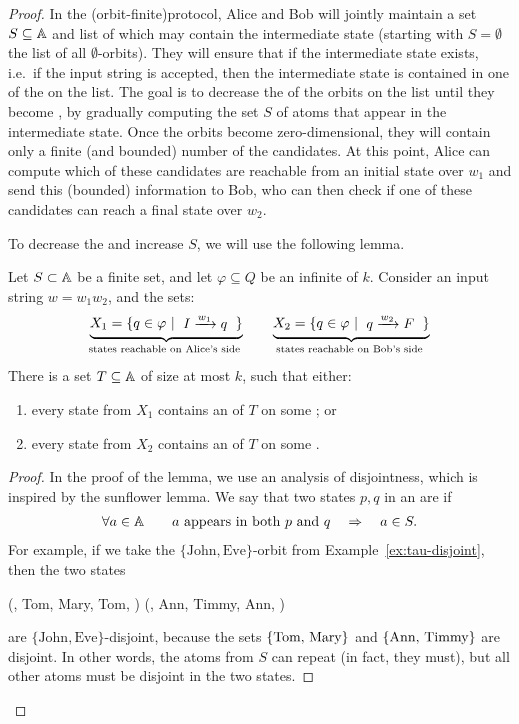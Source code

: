 \begin{proof}
In the \kl(orbit-finite){protocol}, Alice and Bob will jointly maintain a set
$S \subseteq \mathbb A$ and list of  which may contain the
intermediate state (starting with $S = \emptyset$ the list of all
$\emptyset$-orbits). They will ensure that if the intermediate state exists,
i.e.~if the input string is accepted,  then the intermediate state is contained
in one of the  on the list. The goal is to decrease the  of the orbits on the list until they become
, by gradually computing the set $S$ of atoms that appear in
the intermediate state. Once the orbits become zero-dimensional, they will
contain only a finite (and bounded) number of the candidates. At this point,
Alice can compute which of these candidates are reachable from an initial state
over $w_1$ and send this (bounded) information to Bob, who can then check if
one of these candidates can reach a final state over $w_2$. 

To decrease the  and increase $S$, we will use the following lemma.
\begin{lemma}\label{lem:fixed-atoms}
  Let $S \subset \mathbb A$ be a finite set, and let $\varphi \subseteq Q$ be an infinite 
  of  $k$. 
  Consider an input string $w = w_1 w_2$, and the sets:
  \begin{align*}
  \myunderbrace{X_1 = \setbuild{ q \in \varphi}{$ I \xrightarrow{w_1} q$}}{states reachable on Alice's side}
  \qquad
  \myunderbrace{X_2 = \setbuild{ q \in \varphi}{$ q \xrightarrow{w_2} F$}}{states reachable on Bob's side}
  \end{align*}
  There is a set $T \subseteq \mathbb A$ of size at most $k$, such that either: 
  \begin{enumerate}
    \item   every state from $X_1$ contains an  of $T$ on some ; or 
    \item   every state from $X_2$ contains an  of $T$ on some .
  \end{enumerate}
\end{lemma}
    \begin{proof}
      \AP
 In the proof of the lemma, we use an analysis of disjointness, which is
 inspired by the sunflower lemma. We say that two states $p,q$ in an 
 are  if 
 \begin{align*}
    \forall a \in \mathbb A 
    \qquad 
 \text{$a$ appears in both $p$ and $q$} \quad \Rightarrow \quad a \in S.
 \end{align*}
 For example, if we take the $\{\textrm{John}, \textrm{Eve}\}$-orbit from Example~\ref{ex:tau-disjoint}, then the two states
\begin{center}
    (, Tom, Mary, Tom, ) \qquad
    (, Ann, Timmy, Ann, )
\end{center}
are $\{\textrm{John}, \textrm{Eve}\}$-disjoint, because the sets
$\{\text{Tom, Mary}\}$ and $\{\text{Ann, Timmy}\}$ are disjoint. In other
words, the atoms from $S$ can repeat (in fact, they must), but all other atoms
must be disjoint in the two states.


\end{proof}
\end{proof}
